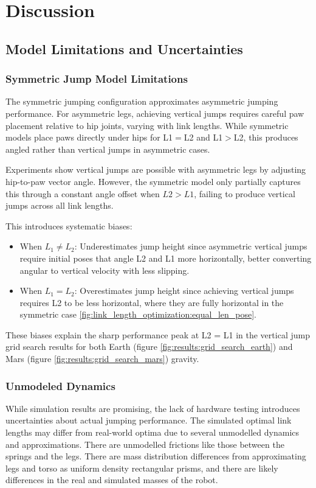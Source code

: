 \section{Discussion}

\subsection{Model Limitations and Uncertainties}

\subsubsection{Symmetric Jump Model Limitations}
The symmetric jumping configuration approximates asymmetric jumping performance. For asymmetric legs, achieving vertical jumps requires careful paw placement relative to hip joints, varying with link lengths. While symmetric models place paws directly under hips for L1$=$L2 and L1$>$L2, this produces angled rather than vertical jumps in asymmetric cases.

Experiments show vertical jumps are possible with asymmetric legs by adjusting hip-to-paw vector angle. However, the symmetric model only partially captures this through a constant angle offset when $L2 > L1$, failing to produce vertical jumps across all link lengths.

This introduces systematic biases:
\begin{itemize}
    \item When \(L_1 \neq L_2\): Underestimates jump height since asymmetric vertical jumps require initial poses that angle L2 and L1 more horizontally, better converting angular to vertical velocity with less slipping.
    \item When \(L_1 = L_2\): Overestimates jump height since achieving vertical jumps requires L2 to be less horizontal, where they are fully horizontal in the symmetric case \ref{fig:link_length_optimization:equal_len_pose}.
\end{itemize}

These biases explain the sharp performance peak at L2 = L1 in the vertical jump grid search results for both Earth (figure \ref{fig:results:grid_search_earth}) and Mars (figure \ref{fig:results:grid_search_mars}) gravity.

\subsubsection{Unmodeled Dynamics}
While simulation results are promising, the lack of hardware testing introduces uncertainties about actual jumping performance. The 
simulated optimal link lengths may differ from real-world optima due to several unmodelled dynamics and approximations. There are 
unmodelled frictions like those between the springs and the legs. There are mass distribution differences from approximating legs and 
torso as uniform density rectangular prisms, and there are likely differences in the real and simulated masses of the robot.

